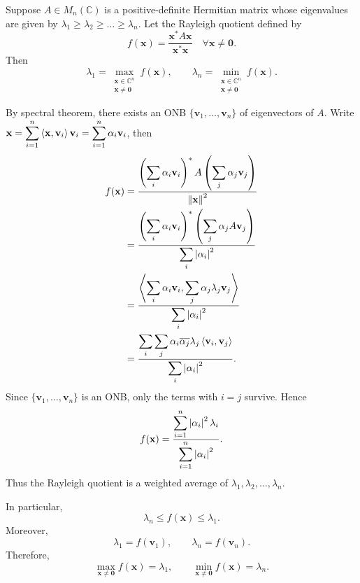 \begin{proposition}
Suppose $A\in M_n(\mathbb{C})$ is a positive-definite Hermitian matrix whose eigenvalues are given by
$\lambda_1\ge \lambda_2\ge \dots \ge \lambda_n$.
Let the Rayleigh quotient defined by
\[
f(\mathbf{x})=\frac{\mathbf{x}^* A\mathbf{x}}{\mathbf{x}^*\mathbf{x}}\quad \forall \mathbf{x}\ne \mathbf{0}.
\]
Then
\[
    \lambda_1
    =
    \max_{\substack{\mathbf{x}\in\mathbb{C}^n\\ \mathbf{x}\neq \mathbf{0}}}
    f(\mathbf{x}),
    \qquad
    \lambda_n
    =
    \min_{\substack{\mathbf{x}\in\mathbb{C}^n\\ \mathbf{x}\neq \mathbf{0}}}
    f(\mathbf{x}).
\]
\end{proposition}

\begin{pfbox}
By spectral theorem, there exists an ONB $\{\mathbf{v}_1,\dots,\mathbf{v}_n\}$ of eigenvectors of $A$. Write $\mathbf{x}=\displaystyle\sum_{i=1}^n \left\langle \mathbf{x}, \mathbf{v}_i \right\rangle\mathbf{v}_i = \displaystyle\sum_{i=1}^n \alpha_i\mathbf{v}_i$, then
\begin{align*}
    f(\mathbf{x})
    &=
    \frac{
    \left( \displaystyle\sum_i \alpha_i\mathbf{v}_i \right)^*
    A\left( \displaystyle\sum_j \alpha_j\mathbf{v}_j \right)
    }
    {\left\lVert \mathbf{x} \right\rVert^2} \\
    &=
    \frac{
    \left( \displaystyle\sum_i \alpha_i\mathbf{v}_i \right)^*
    \left( \displaystyle\sum_j \alpha_j A\mathbf{v}_j \right)
    }
    {\displaystyle\sum_i \left\lvert \alpha_i \right\rvert^2} \\
    &=
    \frac{
    \left\langle \displaystyle\sum_i \alpha_i\mathbf{v}_i, \displaystyle\sum_j \alpha_j\lambda_j\mathbf{v}_j \right\rangle
    }
    {\displaystyle\sum_i \left\lvert \alpha_i \right\rvert^2} \\
    &=
    \frac{
    \displaystyle\sum_i\sum_j \alpha_i\overline{\alpha_j}\lambda_j
    \left\langle \mathbf{v}_i, \mathbf{v}_j \right\rangle
    }
    {\displaystyle\sum_i \left\lvert \alpha_i \right\rvert^2}.
\end{align*}
Since $\{\mathbf{v}_1,\dots,\mathbf{v}_n\}$ is an ONB, only the terms with
$i=j$ survive. Hence
\[
    f(\mathbf{x})
    =
    \frac{
    \displaystyle\sum_{i=1}^n \left\lvert \alpha_i \right\rvert^2\lambda_i
    }
    {
    \displaystyle\sum_{i=1}^n \left\lvert \alpha_i \right\rvert^2
    }.
\]
Thus the Rayleigh quotient is a weighted average of
$\lambda_1,\lambda_2,\dots,\lambda_n$.

In particular,
\[
    \lambda_n
    \le
    f(\mathbf{x})
    \le
    \lambda_1.
\]
Moreover,
\[
    \lambda_1=f(\mathbf{v}_1),
    \qquad
    \lambda_n=f(\mathbf{v}_n).
\]
Therefore,
\[
    \max_{\mathbf{x}\ne \mathbf{0}} f(\mathbf{x})=\lambda_1,
    \qquad
    \min_{\mathbf{x}\ne \mathbf{0}} f(\mathbf{x})=\lambda_n.
\]
\end{pfbox}

